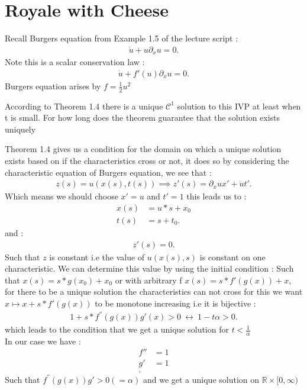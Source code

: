 \section{Royale with Cheese}
Recall Burgers equation from Example 1.5 of the lecture script :
\begin{align*}
	\dot{u} + u \partial_x u = 0
	.\end{align*}
Note this is a scalar conservation law :
\begin{align*}
	\dot{u} + f'(u) \partial_x u = 0
	.\end{align*}
Burgers equation arises by $f = \frac{1}{2} u^2$
\begin{question}
	According to Theorem 1.4 there is a unique $\mathcal{C}^{1} $ solution to this IVP at least when t is small.
	For how long does the theorem guarantee that the solution exists uniquely
\end{question}
\begin{solution}
	Theorem 1.4 gives us a condition for the domain on which a unique solution exists based on if the characteristics cross or not,
	it does so by considering the characteristic equation of Burgers equation, we see that :
	\begin{align*}
		z(s) = u(x(s),t(s)) \implies  z'(s) = \partial_x u x' + \dot{u} t'
		.\end{align*}
	Which means we should choose $x' = u$ and $t' = 1 $ this leads us to :
	\begin{align*}
		x(s) & = u*s + x_{0} \\
		t(s) & = s+t_{0}
		.\end{align*}
	and :
	\begin{align*}
		z'(s) = 0
		.\end{align*}
	Such that $z$ is constant i.e the value of $u(x(s),s)$ is constant on one characteristic.
	We can determine this value by using the initial condition :
	Such that $x(s) = s*g(x_{0}) + x_{0}$ or with arbitrary f $x(s) = s*f'(g(x))+x$, for there to be a unique solution the characteristics can not cross
	for this we want $x \mapsto x+s*f'(g(x))$ to be monotone increasing i.e it is bijective :
	\begin{align*}
		1+s*f^{''}(g(x))g'(x) > 0  \ \leftrightarrow \ 1-t\alpha >0
		.\end{align*}
	which leads to the condition that we get a unique solution for $t< \frac{1}{\alpha } $ \\[1ex]
	In our case we have :
	\begin{align*}
		f'' & = 1  \\
		g'  & =  1 \\
		.\end{align*}
	Such that $f^{''}(g(x))g' > 0 (= \alpha )$  and we get a unique solution on $\mathbb{R} \times  [0,\infty)$
\end{solution}
